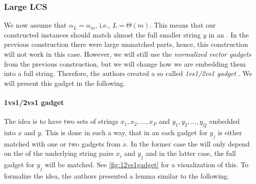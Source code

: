 \subsubsection{Large LCS}

We now assume that $\alpha_L = \alpha_m$, i.e., $L = \Theta(m)$.
This means that our constructed instances should match almost the full smaller string $y$ in an \lcs{}.
In the previous construction there were large unmatched parts, hence, this construction will not work in this case.
However, we will still use the \emph{normalized vector gadgets} from the previous construction, but we will change how we are embedding them into a full string.
Therefore, the authors created a so called \emph{1vs1/2vs1 gadget} \cite[section 9.2.1]{Bringman.2018}.
We will present this gadget in the following.

\paragraph{1vs1/2vs1 gadget}
The idea is to have two sets of strings $x_1, x_2, \ldots, x_P$ and $y_1, y_2, \ldots, y_Q$ embedded into $x$ and $y$.
This is done in such a way, that in an \lcs{} each gadget for $y_j$ is either matched with one or two gadgets from $x$.
In the former case the \lcs{} will only depend on the \lcs{} of the underlying string pairs $x_i$ and $y_j$ and in the latter case, the full gadget for $y_j$ will be matched.
See \autoref{fig:12vs1gadget} for a visualization of this.
To formalize the idea, the authors presented a lemma \cite[Lemma 9.6]{Bringman.2018} similar to the following.






